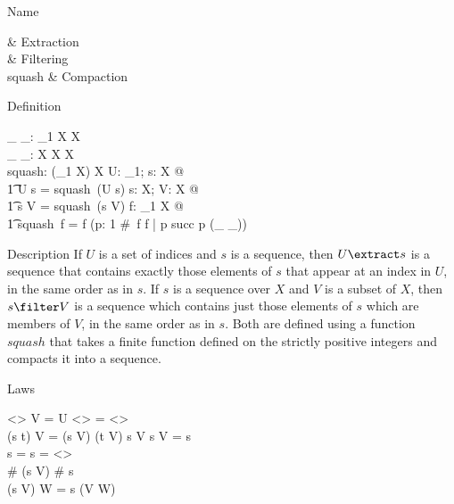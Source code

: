 \begin{manpage}\label{p:4060}
\item[Name]
\begin{name}
	\extract & Extraction%
			\symdex{$\extract$} \\
        \filter & Filtering\symdex{$\project$} \\
	squash & Compaction
\end{name}

\item[Definition]
\begin{gendef}[X]
	\_ \extract \_: \power \nat_1 \cross \seq X \fun \seq X \\
	\_ \filter \_: \seq X \cross \power X \fun \seq X \\
	squash: (\nat_1 \ffun X) \fun \seq X
\where
	\forall U: \power \nat_1; s: \seq X @ \\
\t1		U \extract s = squash~(U \dres s)
\also
	\forall s: \seq X; V: \power X @ \\
\t1		s \filter V = squash~(s \rres V)
\also
	\forall f: \nat_1 \ffun X @ \\
\t1	    squash~f = f \circ (\mu p: 1 \upto \#~f \bij \dom f |
			p \circ succ \circ p \inv \subseteq (\_ \lt \_))
\end{gendef}

\item[Description]
If $U$ is a set of indices and $s$ is a sequence, then $U \extract
s$ is a sequence that contains exactly those elements of $s$ that
appear at an index in $U$, in the same order as in $s$.
If $s$ is a sequence over $X$ and $V$ is a subset of $X$, then
$s \filter V$ is a sequence which contains just those elements of $s$
which are members of $V$, in the same order as in $s$.
Both are defined using a function $squash$ that takes a finite
function defined on the strictly positive integers and compacts it
into a sequence.

\item[Laws]
\begin{laws}
	<> \filter V = U \extract <> = <> \\
        (s \cat t) \filter V = (s \filter V) \cat (t \filter V)
\also
        \ran s \subseteq V \iff s \filter V = s \\
        s \filter \empty = \empty \extract s = <> \\
        \# (s \filter V) \leq \# s \\
        (s \filter V) \filter W = s \filter (V \cap W)
\end{laws}
\end{manpage}
